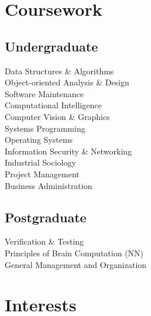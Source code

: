 \documentclass[]{resume}
\begin{document}


\vfill
\begin{minipage}[t]{0.33\textwidth} 
\section{Coursework}
	\subsection{Undergraduate}
		Data Structures \& Algorithms \\
		Object-oriented Analysis \& Design \\
		Software Maintenance \\
		Computational Intelligence\\
		Computer Vision \& Graphics \\
		Systems Programming \\
		Operating Systems \\
		Information Security \& Networking \\
		Industrial Sociology \\
		Project Management \\ 
		Business Administration
		\sectionsep
	
	\subsection{Postgraduate}
		Verification \& Testing \\
		Principles of Brain Computation (NN) \\
		General Management and Organization 
		\sectionsep	

\section{Interests} 

\end{minipage}
\end{document}
